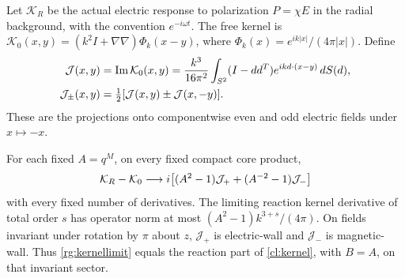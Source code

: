 Let $\mathcal K_R$ be the actual electric response to polarization
$P=\chi E$ in the radial background, with the convention
$e^{-i\omega t}$. The free kernel is
$\mathcal K_0(x,y)=(k^2I+\nabla\nabla)\Phi_k(x-y)$,
where $\Phi_k(x)=e^{ik|x|}/(4\pi|x|)$. Define
\begin{align}
 {\cal J}(x,y)&=\operatorname{Im}{\cal K}_0(x,y)
  =\frac{k^3}{16\pi^2}\int_{S^2}
       (I-dd^T)e^{ikd\cdot(x-y)}\,dS(d),\label{rg:J}\\
 {\cal J}_\pm(x,y)&=\tfrac12[{\cal J}(x,y)\pm{\cal J}(x,-y)].
 \label{rg:Jpm}
\end{align}
These are the projections onto componentwise even and odd
electric fields under $x\mapsto-x$.

\begin{theorem}
\label{rg:local}
For each fixed $A=q^M$, on every fixed compact core product,
\begin{equation}\label{rg:kernellimit}
 {\cal K}_R-{\cal K}_0\longrightarrow
 i\bigl[(A^2-1){\cal J}_+
                  +(A^{-2}-1){\cal J}_-\bigr]
\end{equation}
with every fixed number of derivatives. The limiting reaction
kernel derivative of total order $s$ has operator norm at most
$(A^2-1)k^{3+s}/(4\pi)$.
On fields invariant under rotation by $\pi$ about $z$,
$\mathcal J_+$ is electric-wall and $\mathcal J_-$ is magnetic-wall.
Thus \eqref{rg:kernellimit} equals the reaction part of
\eqref{cl:kernel}, with $B=A$, on that invariant sector.
\end{theorem}
